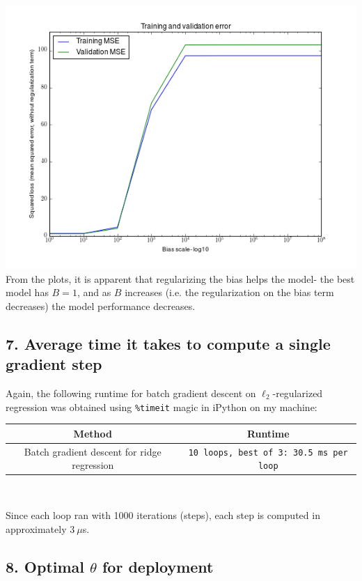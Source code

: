 \documentclass[paper=a4, fontsize=11pt]{scrartcl} %
\numberwithin{equation}{section} %
\numberwithin{figure}{section} %
\numberwithin{table}{section} %
\begin{document}
\includegraphics[scale=.8]{./../figures/2_5_6.png} \\

From the plots, it is apparent that regularizing the bias helps the model- the best model has $B=1$, and as $B$ increases (i.e. the regularization on the bias term decreases) the model performance decreases.

\subsection*{7. Average time it takes to compute a single gradient step}

Again, the following runtime for batch gradient descent on $\ell_2$-regularized regression was obtained using \texttt{\%timeit} magic in iPython on my machine:
\begin{center}
\begin{tabular}{|c | c |}
\hline
Method & Runtime \\
\hline
Batch gradient descent for ridge regression& \texttt{10 loops, best of 3: 30.5 ms per loop} \\
\hline
\end{tabular} \\
\end{center}

Since each loop ran with 1000 iterations (steps), each step is computed in approximately $3~\mu$s.

\subsection*{8. Optimal $\theta$ for deployment}
\end{document}
